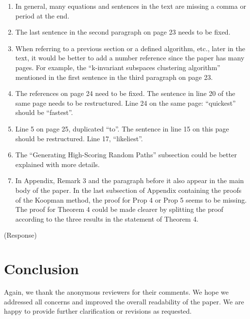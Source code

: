 \documentclass{letter}
\begin{document}
\begin{enumerate}
	\item In general, many equations and sentences in the text are missing a
	comma or period at the end.
	\item The last sentence in the second paragraph on page 23 needs to be fixed.
	\item When referring to a previous section or a defined algorithm, etc., later in the text, it would be better to add a number reference since the paper has many pages. For example, the “k-invariant subspaces clustering algorithm” mentioned in the first sentence in the third paragraph on page 23.
	\item The references on page 24 need to be fixed. The sentence in line 20 of the same page needs to be restructured. Line 24 on the same page: 	“quickest” should be “fastest”.
	\item Line 5 on page 25, duplicated “to”. The sentence in line 15 on this page should be restructured. Line 17, “likeliest”.
	\item The “Generating High-Scoring Random Paths” subsection could be better explained with more details.
	\item In Appendix, Remark 3 and the paragraph before it also appear in the main body of the paper. In the last subsection of Appendix containing the proofs of the Koopman method, the proof for Prop 4 or Prop 5 seems to be missing. The proof for Theorem 4 could be made clearer by splitting the proof according to the three results in the statement of Theorem 4.
\end{enumerate}

{\color{red}(Response)} 

\section{Conclusion}

Again, we thank the anonymous reviewers for their comments. We hope we addressed all concerns and improved the overall readability of the paper. We are happy to provide further clarification or revisions as requested.





\small
%


\end{document}
